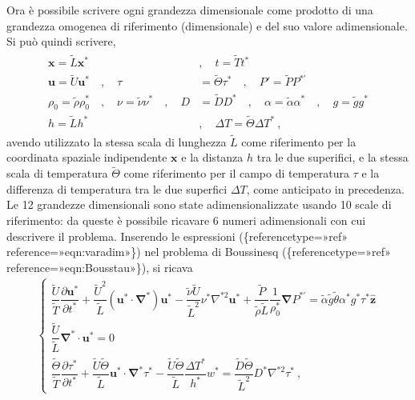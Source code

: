 \documentclass[letterpaper,10pt,italian]{jupyterBook}
\begin{document}
\sphinxAtStartPar
Ora è possibile scrivere ogni grandezza dimensionale come prodotto di
una grandezza omogenea di riferimento (dimensionale) e del suo valore
adimensionale. Si può quindi scrivere,
\begin{equation*}
\begin{split}\label{eqn:var-adim}
\begin{aligned}
    \mathbf{x} = \tilde{L} \mathbf{x}^*  \quad & , \quad t = \tilde{T} t^* \\
    \mathbf{u} = \tilde{U} \mathbf{u}^* \quad , \quad \tau & = \tilde{\Theta} \tau^* \quad , \quad P' = \tilde{P} P^{*'} \\
    \rho_0 = \tilde{\rho} \rho_0^* \quad  , \quad \nu = \tilde{\nu} \nu^* \quad , \quad D & = \tilde{D} D^* \quad , \quad \alpha = \tilde{\alpha} \alpha^* \quad , \quad g = \tilde{g} g^* \\
    h = \tilde{L} h^* \quad & , \quad \Delta T = \tilde{\Theta} \Delta T^* \ ,
\end{aligned}\end{split}
\end{equation*}
\sphinxAtStartPar
avendo utilizzato la stessa scala di lunghezza
\(\tilde{L}\) come riferimento per la coordinata spaziale indipendente
\(\mathbf{x}\) e la distanza \(h\) tra le due superifici, e la stessa scala di
temperatura \(\tilde{\Theta}\) come riferimento per il campo di
temperatura \(\tau\) e la differenza di temperatura tra le due superfici
\(\Delta T\), come anticipato in precedenza. Le 12 grandezze dimensionali
sono state adimensionalizzate usando 10 scale di riferimento: da queste
è possibile ricavare 6 numeri adimensionali con cui descrivere il
problema. Inserendo le espressioni
(\{reference\sphinxhyphen{}type=»ref»
reference=»eqn:var\sphinxhyphen{}adim»\}) nel problema di Boussinesq
(\{reference\sphinxhyphen{}type=»ref»
reference=»eqn:Bouss\sphinxhyphen{}tau»\}), si ricava
\begin{equation*}
\begin{split}\label{eqn:Bouss-tau-adim-1}
    \begin{cases}
      \dfrac{\tilde{U}}{\tilde{T}}\dfrac{\partial \mathbf{u}^*}{\partial t^*} + \dfrac{\tilde{U}^2}{\tilde{L}}
      \left( \mathbf{u}^* \cdot \mathbf{\nabla}^* \right) \mathbf{u}^* -
      \dfrac{\tilde{\nu} \tilde{U}}{\tilde{L}^2} \nu^* \nabla^{*2} \mathbf{u}^* + \dfrac{\tilde{P}}{\tilde{\rho} \tilde{L}}\dfrac{1}{\rho_0^*}\mathbf{\nabla} P^{*'} = \tilde{\alpha} \tilde{g} \tilde{\theta} \alpha^*  g^* \tau^* \mathbf{\hat{z}} \\
      \dfrac{\tilde{U}}{\tilde{L}}\mathbf{\nabla}^* \cdot \mathbf{u}^* = 0 \\
      \dfrac{\tilde{\Theta}}{\tilde{T}}\dfrac{\partial \tau^*}{\partial t^*} + \dfrac{\tilde{U}\tilde{\Theta}}{\tilde{L}}\mathbf{u}^* \cdot 
      \mathbf{\nabla}^* \tau^* - \dfrac{\tilde{U}\tilde{\Theta}}{\tilde{L}}\dfrac{\Delta T^*}{h^*} w^* = \dfrac{\tilde{D}\tilde{\Theta}}{\tilde{L}^2} D^* \nabla^{*2} \tau^* \ ,
    \end{cases}\end{split}
\end{equation*}
\end{document}
